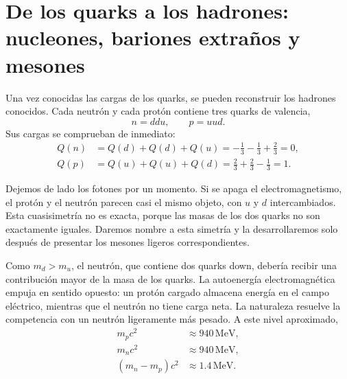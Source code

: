 \begin{classroomqa}
\end{classroomqa}

\section{De los quarks a los hadrones: nucleones, bariones extraños y mesones}

Una vez conocidas las cargas de los quarks, se pueden reconstruir los hadrones conocidos. Cada neutrón y cada protón contiene tres quarks de valencia,
\begin{equation}
n=ddu,
\qquad
p=uud.
\end{equation}
Sus cargas se comprueban de inmediato:
\begin{align}
Q(n) &= Q(d)+Q(d)+Q(u)
= -\frac13-\frac13+\frac23
=0,\\
Q(p) &= Q(u)+Q(u)+Q(d)
= \frac23+\frac23-\frac13
=1.
\end{align}

Dejemos de lado los fotones por un momento. Si se apaga el electromagnetismo, el protón y el neutrón parecen casi el mismo objeto, con \(u\) y \(d\) intercambiados. Esta cuasisimetría no es exacta, porque las masas de los dos quarks no son exactamente iguales. Daremos nombre a esta simetría y la desarrollaremos solo después de presentar los mesones ligeros correspondientes.

Como \(m_d>m_u\), el neutrón, que contiene dos quarks down, debería recibir una contribución mayor de la masa de los quarks. La autoenergía electromagnética empuja en sentido opuesto: un protón cargado almacena energía en el campo eléctrico, mientras que el neutrón no tiene carga neta. La naturaleza resuelve la competencia con un neutrón ligeramente más pesado. A este nivel aproximado,
\begin{align}
m_pc^2&\approx940\,\mathrm{MeV},\\
m_nc^2&\approx940\,\mathrm{MeV},\\
(m_n-m_p)c^2&\approx1.4\,\mathrm{MeV}.
\end{align}

